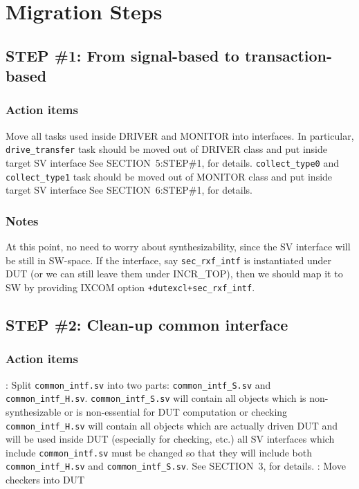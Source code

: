 \documentclass{note}
\begin{document}
%

\section{Migration Steps}

\subsection{STEP \#1: From signal-based to transaction-based}
\subsubsection{Action items}
\bit
\w Move all tasks used inside DRIVER and MONITOR into interfaces. 
   In particular, 
   \bit
   \w \verb+drive_transfer+ task should be moved out of DRIVER class
       and put inside target SV interface
      \bit
      \w See SECTION~5:STEP\#1, for details.
      \eit
   \w \verb+collect_type0+ and \verb+collect_type1+ task should be
      moved out of MONITOR class and put inside target SV interface
      \bit
      \w See SECTION~6:STEP\#1, for details.
      \eit
   \eit
\eit
\subsubsection{Notes}
\bit
\w At this point, no need to worry about synthesizability,
 since the SV interface will be still in SW-space. If the interface, say
 \verb+sec_rxf_intf+ is instantiated under DUT (or we can still leave
 them under INCR\_TOP), then we should map it to
 SW by providing IXCOM option \verb|+dutexcl+sec_rxf_intf|. 
\eit

\subsection{STEP \#2: Clean-up common interface}
\subsubsection{Action items}
\bit
\w {}: Split \verb+common_intf.sv+ into two parts:
  \verb+common_intf_S.sv+ and \verb+common_intf_H.sv+. 
   \bit
   \w \verb+common_intf_S.sv+ will contain all objects which is
     non-synthesizable or is non-essential for DUT computation or checking
   \w \verb+common_intf_H.sv+ will contain all objects which are actually
     driven DUT and will be used inside DUT (especially for checking, etc.)
   \w all SV interfaces which include \verb+common_intf.sv+ must be changed 
   so that they will include both \verb+common_intf_H.sv+ and
   \verb+common_intf_S.sv+. 
      \bit
      \w See SECTION~3, for details.
      \eit
   \eit
\w {}: Move checkers into DUT
\eit
\end{document}
